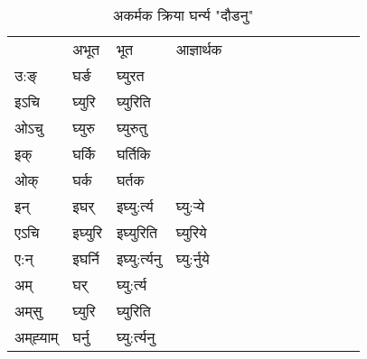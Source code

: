 \begin{table}[H]
\centering
\caption{\label{ur.vi} अकर्मक क्रिया  घर्न्य  "दौडनु"  }
\begin{tabular}{l|l|l|l|l|l|l|l|l|l|l|l|l}  \toprule
&अभूत & भूत & आज्ञार्थक \\ 
उ:ङ्‌ &घर्ङ &घ्युरत \\ 
इऽचि &घ्युरि &घ्युरिति   \\ 
ओऽचु &घ्युरु &घ्युरुतु   \\ 
इक् &घर्कि &घर्तिकि   \\ 
ओक् &घर्क &घर्तक   \\ 
इन् & इघर् & इघ्यु:र्त्य &घ्यु:र्‍ये  \\ 
एऽचि & इघ्युरि & इघ्युरिति &घ्युरिये    \\ 
ए:न् & इघर्नि  & इघ्यु:र्त्यनु &घ्यु:र्नुये  \\ 
अम् & घर् & घ्यु:र्त्य   \\ 
अम्‌सु & घ्युरि & घ्युरिति   \\ 
अम्‌ह्‍याम् & घर्नु  & घ्यु:र्त्यनु \\ 
\bottomrule
\end{tabular}
\end{table}


